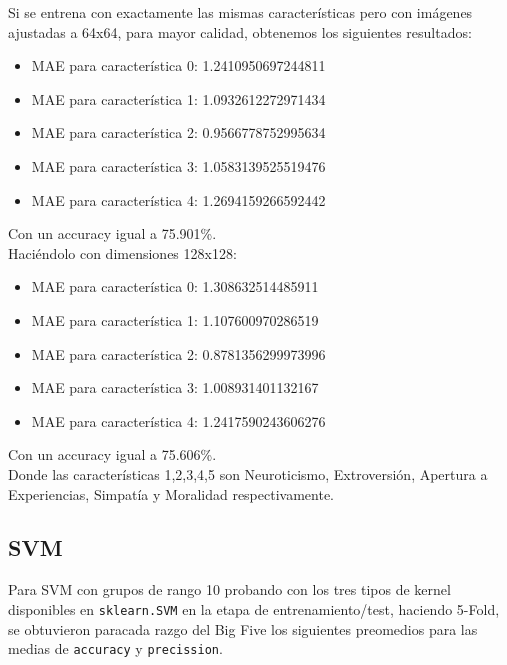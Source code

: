\documentclass[10pt, a4paper]{article}
\begin{document}
                Si se entrena con exactamente las mismas caracter\'isticas pero con im\'agenes ajustadas a 64x64, para mayor calidad, obtenemos los siguientes resultados:
                \begin{itemize}
                    \item[] MAE para caracter\'istica 0: 1.2410950697244811
                    \item[] MAE para caracter\'istica 1: 1.0932612272971434
                    \item[] MAE para caracter\'istica 2: 0.9566778752995634
                    \item[] MAE para caracter\'istica 3: 1.0583139525519476
                    \item[] MAE para caracter\'istica 4: 1.2694159266592442
                \end{itemize}
                
                Con un accuracy igual a 75.901\%.\\

                Haci\'endolo con dimensiones 128x128:
                \begin{itemize}
                    \item[] MAE para caracter\'istica 0: 1.308632514485911
                    \item[] MAE para caracter\'istica 1: 1.107600970286519
                    \item[] MAE para caracter\'istica 2: 0.8781356299973996
                    \item[] MAE para caracter\'istica 3: 1.008931401132167
                    \item[] MAE para caracter\'istica 4: 1.2417590243606276
                \end{itemize}
                
                Con un accuracy igual a 75.606\%.\\
                
                Donde las caracter\'isticas 1,2,3,4,5 son Neuroticismo, Extroversi\'on, Apertura a Experiencias, 
                Simpat\'ia y Moralidad respectivamente.
            
            \subsection{SVM} 
            Para SVM con grupos de rango 10 probando con los tres tipos de kernel disponibles en \texttt{sklearn.SVM} en la etapa de 
            entrenamiento/test, haciendo 5-Fold, se obtuvieron paracada razgo del Big Five los siguientes preomedios para las medias de
            \texttt{accuracy} y \texttt{precission}.
\end{document}
